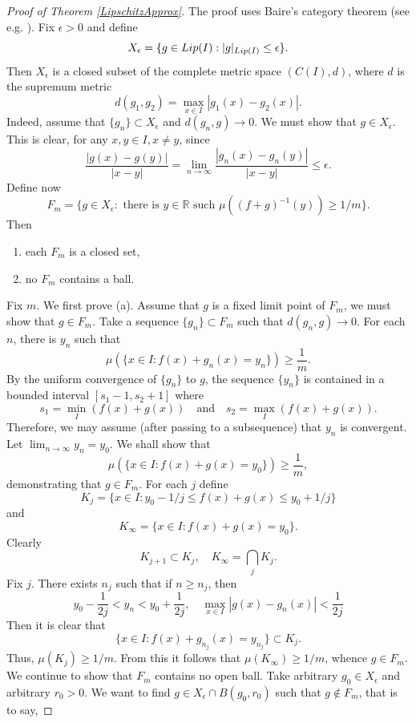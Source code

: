 \documentclass[10pt,a4paper]{amsart}
\numberwithin{equation}{section}
\begin{document}
\begin{proof}[Proof of Theorem \ref{LipschitzApprox}]
The proof uses Baire's category theorem (see e.g. \cite[Chapter 4]{ShSt11}). Fix $\epsilon>0$ and define 
\begin{equation}
    \nonumber
    X_\epsilon=\{g\in{\rm Lip}(I): |g|_{{\rm Lip}(I)}\le\epsilon\}.
\end{equation}
Then $X_\epsilon$ is a closed subset of the complete metric space $(C(I),d)$, where $d$ is the supremum metric
$$
d(g_1,g_2)=\max_{x\in I}|g_1(x)-g_2(x)|.
$$
Indeed, assume that $\{g_n\}\subset X_\epsilon$ and $d(g_n,g)\rightarrow0$. We must show that $g\in X_\epsilon$.
This is clear, for any $x,y\in I, x\neq y$, since
$$
\frac{|g(x)-g(y)|}{|x-y|}=\lim_{n\rightarrow\infty}\frac{|g_n(x)-g_n(y)|}{|x-y|}\le\epsilon.
$$
Define now
$$
F_m=\{g\in X_\epsilon: \text{ there is }y\in\mathbb{R}\text{ such }\mu((f+g)^{-1}(y))\ge 1/m\}.
$$
Then
\begin{enumerate}
    \item[(a)] each $F_m$ is a closed set,
    \item[(b)] no $F_m$ contains a ball.
\end{enumerate}
Fix $m$. We first prove (a). Assume that $g$ is a fixed limit point of $F_m$, we must show that $g\in F_m$. Take a sequence $\{g_n\}\subset F_m$ such that $d(g_n,g)\rightarrow0$. For each $n$, there is $y_n$ such that
\begin{equation}
    \nonumber
    \mu(\{x\in I:f(x)+g_n(x)=y_n\})\ge\frac{1}{m}.
\end{equation}
By the uniform convergence of $\{g_n\}$ to $g$, the sequence $\{y_n\}$ is contained in a bounded interval $[s_1-1,s_2+1]$ where 
$$
s_1=\min_I(f(x)+g(x))\quad\text{and}\quad s_2=\max_I(f(x)+g(x)).
$$
Therefore, we may assume (after passing to a subsequence) that $y_n$ is convergent. Let $\lim_{n\rightarrow\infty}y_n=y_0$. We shall show that
\begin{equation}
    \nonumber
    \mu(\{x\in I:f(x)+g(x)=y_0\})\ge\frac{1}{m},
\end{equation}
demonstrating that $g\in F_m$. For each $j$ define
$$
K_j=\{x\in I:y_0-1/j\le f(x)+g(x)\le y_0+1/j\}
$$
and 
$$
K_\infty=\{x\in I:f(x)+g(x)=y_0\}.
$$
Clearly 
$$
K_{j+1}\subset K_j,\quad K_\infty=\bigcap_jK_j.
$$
Fix $j$. There exists $n_j$ such that if $n\ge n_j$, then
$$
y_0-\frac{1}{2j}<y_n<y_0+\frac{1}{2j},\quad\max_{x\in I}|g(x)-g_n(x)|<\frac{1}{2j}
$$
Then it is clear that
$$
\{x\in I:f(x)+g_{n_j}(x)=y_{n_j}\}\subset K_j.
$$
Thus, $\mu(K_j)\ge1/m$. From this it follows that $\mu(K_\infty)\ge1/m$, whence $g\in F_m$. We continue to show that $F_m$ contains no open ball. Take arbitrary $g_0\in X_\epsilon$ and arbitrary $r_0>0$. We want to find $g\in X_\epsilon\cap B(g_0,r_0)$ such that $g\notin F_m$, that is to say,

\end{proof}
\end{document}
